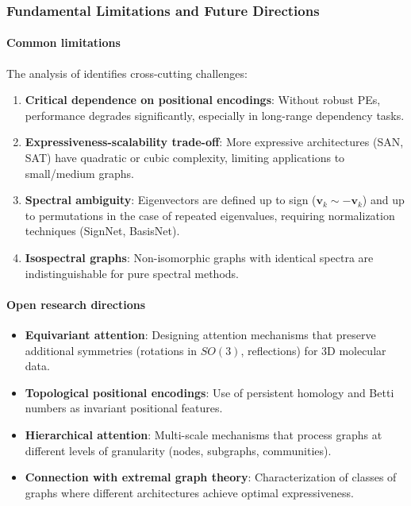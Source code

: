 \subsubsection{Fundamental Limitations and Future Directions}\label{subsubsec:limitations_future}

\paragraph{Common limitations}

The analysis of \citet{ying2021transformers} identifies cross-cutting challenges:

\begin{enumerate}
    \item \textbf{Critical dependence on positional encodings}: Without robust PEs, performance degrades significantly, especially in long-range dependency tasks.

    \item \textbf{Expressiveness-scalability trade-off}: More expressive architectures (SAN, SAT) have quadratic or cubic complexity, limiting applications to small/medium graphs.

    \item \textbf{Spectral ambiguity}: Eigenvectors are defined up to sign ($\mathbf{v}_k \sim -\mathbf{v}_k$) and up to permutations in the case of repeated eigenvalues, requiring normalization techniques (SignNet, BasisNet).

    \item \textbf{Isospectral graphs}: Non-isomorphic graphs with identical spectra are indistinguishable for pure spectral methods.
\end{enumerate}

\paragraph{Open research directions}

\begin{itemize}
    \item \textbf{Equivariant attention}: Designing attention mechanisms that preserve additional symmetries (rotations in $SO(3)$, reflections) for 3D molecular data.

    \item \textbf{Topological positional encodings}: Use of persistent homology and Betti numbers as invariant positional features.

    \item \textbf{Hierarchical attention}: Multi-scale mechanisms that process graphs at different levels of granularity (nodes, subgraphs, communities).

    \item \textbf{Connection with extremal graph theory}: Characterization of classes of graphs where different architectures achieve optimal expressiveness.
\end{itemize}


